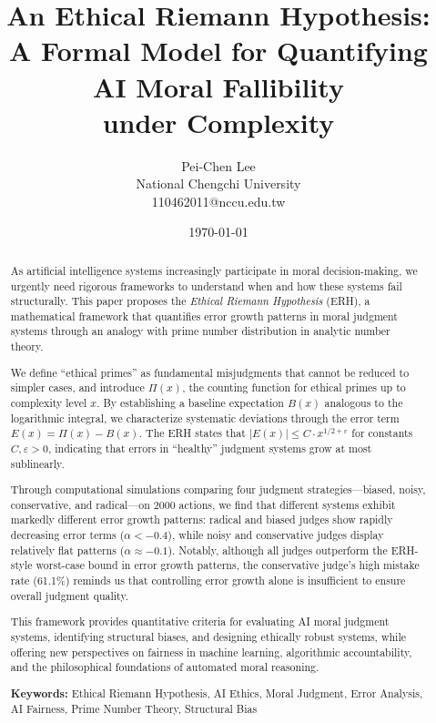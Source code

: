 \documentclass[12pt,a4paper]{article}
\title{An Ethical Riemann Hypothesis:\\
       A Formal Model for Quantifying AI Moral Fallibility\\
       under Complexity}
\author{Pei-Chen Lee \\
        National Chengchi University \\
        110462011@nccu.edu.tw}
\date{\today}
\theoremstyle{definition}
\theoremstyle{remark}
\begin{document}
\maketitle

\begin{abstract}
As artificial intelligence systems increasingly participate in moral decision-making, we urgently need rigorous frameworks to understand when and how these systems fail structurally. This paper proposes the \emph{Ethical Riemann Hypothesis} (ERH), a mathematical framework that quantifies error growth patterns in moral judgment systems through an analogy with prime number distribution in analytic number theory.

We define ``ethical primes'' as fundamental misjudgments that cannot be reduced to simpler cases, and introduce $\Pi(x)$, the counting function for ethical primes up to complexity level $x$. By establishing a baseline expectation $B(x)$ analogous to the logarithmic integral, we characterize systematic deviations through the error term $E(x) = \Pi(x) - B(x)$. The ERH states that $|E(x)| \leq C \cdot x^{1/2 + \varepsilon}$ for constants $C, \varepsilon > 0$, indicating that errors in ``healthy'' judgment systems grow at most sublinearly.

Through computational simulations comparing four judgment strategies---biased, noisy, conservative, and radical---on 2000 actions, we find that different systems exhibit markedly different error growth patterns: radical and biased judges show rapidly decreasing error terms ($\alpha < -0.4$), while noisy and conservative judges display relatively flat patterns ($\alpha \approx -0.1$). Notably, although all judges outperform the ERH-style worst-case bound in error growth patterns, the conservative judge's high mistake rate (61.1\%) reminds us that controlling error growth alone is insufficient to ensure overall judgment quality.

This framework provides quantitative criteria for evaluating AI moral judgment systems, identifying structural biases, and designing ethically robust systems, while offering new perspectives on fairness in machine learning, algorithmic accountability, and the philosophical foundations of automated moral reasoning.

\textbf{Keywords:} Ethical Riemann Hypothesis, AI Ethics, Moral Judgment, Error Analysis, AI Fairness, Prime Number Theory, Structural Bias
\end{abstract}

\end{document}
